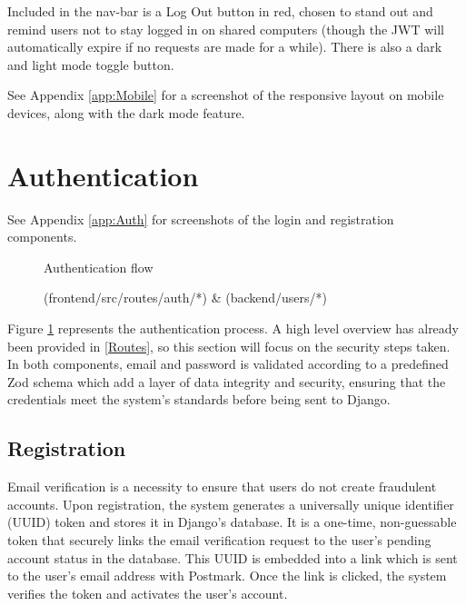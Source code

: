 Included in the nav-bar is a Log Out button in red, chosen to stand out and remind users not to stay logged in on shared computers (though the JWT will automatically expire if no requests are made for a while). There is also a dark and light mode toggle button.

See Appendix \ref{app:Mobile} for a screenshot of the responsive layout on mobile devices, along with the dark mode feature.

\section{Authentication}
\vspace{-5pt}
{\footnotesize See Appendix \ref{app:Auth} for screenshots of the login and registration components.}
\vspace{-5pt}
\begin{figure}[h]
\centering
{}
\vspace{-20pt}
\caption{Authentication flow}
\vspace{-10pt}
\caption*{(frontend/src/routes/auth/*) \& (backend/users/*)}
\label{fig:auth}
\vspace{-20pt}
\end{figure}

Figure \ref{fig:auth} represents the authentication process. A high level overview has already been provided in \ref{Routes}, so this section will focus on the security steps taken. In both components, email and password is validated according to a predefined Zod schema which add a layer of data integrity and security, ensuring that the credentials meet the system's standards before being sent to Django. 
\subsection{Registration}
Email verification is a necessity to ensure that users do not create fraudulent accounts. Upon registration, the system generates a universally unique identifier (UUID) token and stores it in Django's database.  It is a one-time, non-guessable token that securely links the email verification request to the user's pending account status in the database. This UUID is embedded into a link which is sent to the user's email address with Postmark. Once the link is clicked, the system verifies the token and activates the user's account.

